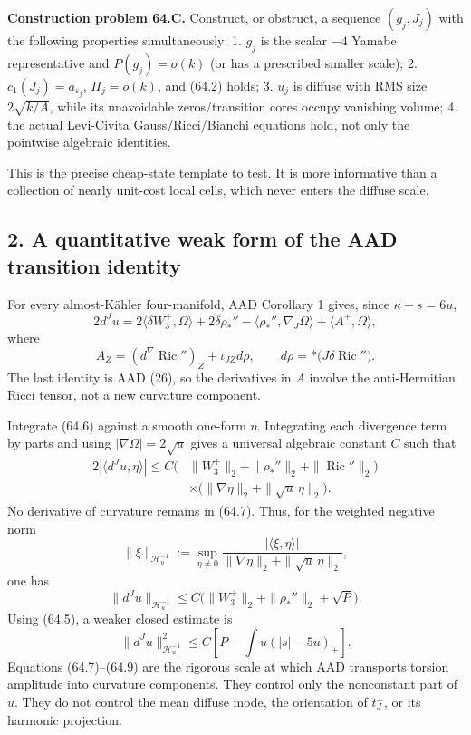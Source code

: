 \documentclass[
  10pt,
]{report}
\begin{document}
\textbf{Construction problem 64.C.} Construct, or obstruct, a sequence
\((g_j,J_j)\) with the following properties simultaneously: 1. \(g_j\)
is the scalar \(-4\) Yamabe representative and \(P(g_j)=o(k)\) (or has a
prescribed smaller scale); 2. \(c_1(J_j)=a_{\varepsilon_j}\),
\(\Pi_j=o(k)\), and (64.2) holds; 3. \(u_j\) is diffuse with RMS size
\(2\sqrt{k/A}\), while its unavoidable zeros/transition cores occupy
vanishing volume; 4. the actual Levi-Civita Gauss/Ricci/Bianchi
equations hold, not only the pointwise algebraic identities.

This is the precise cheap-state template to test. It is more informative
than a collection of nearly unit-cost local cells, which never enters
the diffuse scale.

\hypertarget{a-quantitative-weak-form-of-the-aad-transition-identity}{%
\subsection{2. A quantitative weak form of the AAD transition
identity}\label{a-quantitative-weak-form-of-the-aad-transition-identity}}

For every almost-Kähler four-manifold, AAD Corollary 1 gives, since
\(\kappa-s=6u\), \[
\boxed{
2d^Ju=
2\langle\delta W_3^+,\Omega\rangle
+2\delta\rho_*''
-\langle\rho_*'',\nabla_J\Omega\rangle
+\langle A^+,\Omega\rangle,
}
\tag{64.6}
\] where \[
 A_Z=(d^\nabla\operatorname{Ric}'')_Z+\iota_{JZ}d\rho,
 \qquad d\rho=*\bigl(J\delta\operatorname{Ric}''\bigr).
\] The last identity is AAD (26), so the derivatives in \(A\) involve
the anti-Hermitian Ricci tensor, not a new curvature component.

Integrate (64.6) against a smooth one-form \(\eta\). Integrating each
divergence term by parts and using \(|\nabla\Omega|=2\sqrt u\) gives a
universal algebraic constant \(C\) such that \[
\begin{split}
2|\langle d^Ju,\eta\rangle|
\le C\bigl(&\|W_3^+\|_2+\|\rho_*''\|_2+\|\operatorname{Ric}''\|_2\bigr)\\
&\times\bigl(\|\nabla\eta\|_2+\|\sqrt u\,\eta\|_2\bigr).
\end{split}
\tag{64.7}
\] No derivative of curvature remains in (64.7). Thus, for the weighted
negative norm \[
 \|\xi\|_{\mathcal H_u^{-1}}
 :=\sup_{\eta\ne0}\frac{|\langle\xi,\eta\rangle|}
 {\|\nabla\eta\|_2+\|\sqrt u\,\eta\|_2},
\] one has \[
 \|d^Ju\|_{\mathcal H_u^{-1}}
 \le C\bigl(\|W_3^+\|_2+\|\rho_*''\|_2+\sqrt P\bigr).
\tag{64.8}
\] Using (64.5), a weaker closed estimate is \[
 \|d^Ju\|_{\mathcal H_u^{-1}}^2
 \le C\left[P+\int u(|s|-5u)_+\right].
\tag{64.9}
\] Equations (64.7)--(64.9) are the rigorous scale at which AAD
transports torsion amplitude into curvature components. They control
only the nonconstant part of \(u\). They do not control the mean diffuse
mode, the orientation of \(t_J^-\), or its harmonic projection.
\end{document}
